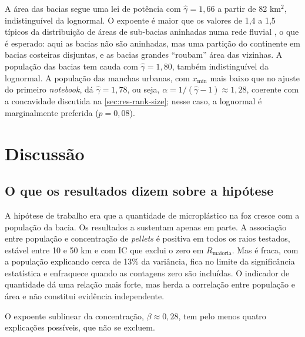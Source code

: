 A área das bacias segue uma lei de potência com $\hat{\gamma} = 1{,}66$ a partir de 82 km$^2$, indistinguível da lognormal. O expoente é maior que os valores de 1,4 a 1,5 típicos da distribuição de áreas de sub-bacias aninhadas numa rede fluvial \cite{rodrigueziturbe1997,maritan1996}, o que é esperado: aqui as bacias não são aninhadas, mas uma partição do continente em bacias costeiras disjuntas, e as bacias grandes ``roubam'' área das vizinhas. A população das bacias tem cauda com $\hat{\gamma} = 1{,}80$, também indistinguível da lognormal. A população das manchas urbanas, com $x_{\min}$ mais baixo que no ajuste do primeiro \textit{notebook}, dá $\hat{\gamma} = 1{,}78$, ou seja, $\alpha = 1/(\hat{\gamma} - 1) \approx 1{,}28$, coerente com a concavidade discutida na \autoref{sec:res-rank-size}; nesse caso, a lognormal é marginalmente preferida ($p = 0{,}08$).

\section{Discussão}
\label{sec:discussao}

\subsection{O que os resultados dizem sobre a hipótese}

A hipótese de trabalho era que a quantidade de microplástico na foz cresce com a população da bacia. Os resultados a sustentam apenas em parte. A associação entre população e concentração de \textit{pellets} é positiva em todos os raios testados, estável entre 10 e 50 km e com IC que exclui o zero em $R_{\mathrm{maioria}}$. Mas é fraca, com a população explicando cerca de 13\% da variância, fica no limite da significância estatística e enfraquece quando as contagens zero são incluídas. O indicador de quantidade dá uma relação mais forte, mas herda a correlação entre população e área e não constitui evidência independente.

O expoente sublinear da concentração, $\beta \approx 0{,}28$, tem pelo menos quatro explicações possíveis, que não se excluem.

